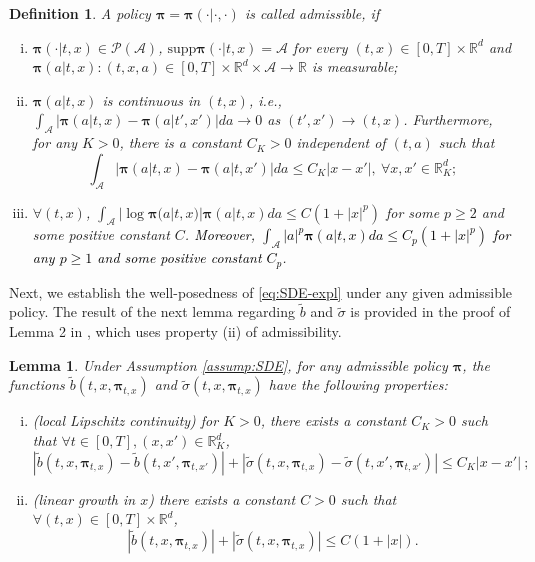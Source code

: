 \documentclass[11pt]{article}
\newtheorem{lemma}{Lemma}
\newtheorem{definition}{Definition}
\newcommand{\1}{\mathbbm{1}}
\newcommand{\bpi}{\boldsymbol{\pi}}
\newcommand{\rev}[1]{\textcolor{black}{{#1}}} %
\begin{document}
\begin{definition}\label{def:policy}
	A policy $\bpi = \bpi(\cdot| \cdot, \cdot)$ is called admissible, if
	\begin{enumerate}[(i)]
		\item $\bpi(\cdot| t,x) \in \mathcal{P} (\mathcal{A})$,  $\text{supp}\bpi(\cdot| t,x) = \mathcal{A}$ for every $(t,x) \in [0, T] \times \mathbb{R}^d$ and $\boldsymbol{\pi} (a| t,x): (t,x,a) \in [0, T] \times   \mathbb{R}^d \times \mathcal{A} \rightarrow \mathbb{R}$ is measurable;
		
		\item $\bpi(a|t,x)$ is continuous in $(t,x)$, i.e.,  $\int_{\mathcal{A}}\left|\bpi(a|t,x)-\bpi(a|t',x')\right|da\to 0$ as $(t',x')\to (t,x)$. Furthermore, for any $K>0$, there is a constant $C_K>0$ independent of $(t,a)$ such that
		\begin{equation}
			\int_{\mathcal{A}}\left|\bpi(a|t,x)-\bpi(a|t,x')\right|da\leq C_K|x-x'|,\ \forall x,x'\in\mathbb{R}^d_K;
		\end{equation}
	
		\item $\forall (t,x)$, $\int_{\mathcal{A}} |\log \boldsymbol{\pi}(a|t,x)| \boldsymbol{\pi}(a |t,x) da \le C (1+ |x|^p)$ for some $p\geq 2$ and some positive constant $C$. \rev{Moreover, $\int_{\mathcal{A}} |a|^p\bpi(a|t,x) da \le C_p (1+ |x|^p)$ for any $p\geq 1$ and some positive constant $C_p$}.
	\end{enumerate}
\end{definition}

Next, we establish the well-posedness of \eqref{eq:SDE-expl} under any given admissible policy. The result of the next lemma regarding $\tilde b$ and $\tilde \sigma$ is provided in the proof of Lemma 2 in \cite{jia2022policyb}, which uses property (ii) of admissibility.

\begin{lemma}\label{lem:expl-diff-coeffs}
	Under Assumption \ref{assump:SDE}, for any admissible policy $\bpi$, the functions $\tilde{b}(t, x, \bpi_{t,x})$ and $\tilde{\sigma}(t, x, \bpi_{t,x})$ have the following properties:
	\begin{enumerate}[(i)]
		\item (local Lipschitz continuity) for $K>0$, there exists a constant $C_K>0$ such that $\forall t\in[0, T], (x,x')\in\mathbb{R}^d_K$,
		\begin{equation}
			|\tilde{b}(t,x,\bpi_{t,x})-\tilde{b}(t,x',\bpi_{t,x'})|+|\tilde{\sigma}(t,x,\bpi_{t,x})-\tilde{\sigma}(t,x',\bpi_{t,x'})|\leq C_K|x-x'|\ ;
		\end{equation}
		
		\item (linear growth in $x$) there exists a constant $C>0$ such that $\forall(t, x) \in[0, T] \times \mathbb{R}^d$,
		\begin{equation}
			|\tilde{b}(t,x,\bpi_{t,x})|+|\tilde{\sigma}(t,x,\bpi_{t,x})|\leq C(1+|x|).
		\end{equation}
	\end{enumerate}
\end{lemma}
\end{document}
